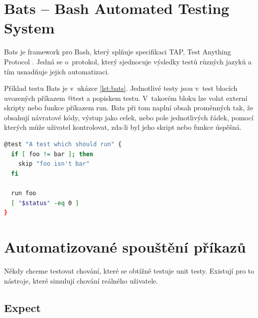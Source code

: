 \documentclass[thesis=M,czech]{FITthesis}[2012/06/26]
\begin{document}


\section{Bats -- Bash Automated Testing System}
Bats \cite{bats} je framework pro Bash, který splňuje specifikaci TAP, Test Anything Protocol \cite{tap}. Jedná se o~protokol, který sjednocuje výsledky testů různých jazyků a tím usnadňuje jejich automatizaci.

Příklad testu Bats je v~ukázce \ref{lst:bats}. Jednotlivé testy jsou v~test blocích uvozených příkazem @test a popiskem testu. V~takovém bloku lze volat externí skripty nebo funkce příkazem run. Bats při tom naplní obsah proměnných tak, že obsahují návratové kódy, výstup jako celek, nebo pole jednotlivých řádek, pomocí kterých může uživatel kontrolovat, zda-li byl jeho skript nebo funkce úspěšná.

\noindent
\begin{minipage}{\linewidth}
\begin{lstlisting}[language=bash, caption={Bats}, label={lst:bats}]
@test "A test which should run" {
  if [ foo != bar ]; then
    skip "foo isn't bar"
  fi

  run foo
  [ "$status" -eq 0 ]
}
\end{lstlisting}
\end{minipage}




%
\section{Automatizované spouštění příkazů}

Někdy chceme testovat chování, které se obtížně testuje unit testy. Existují pro to nástroje, které simulují chování reálného uživatele.


\subsection{Expect}
\end{document}
